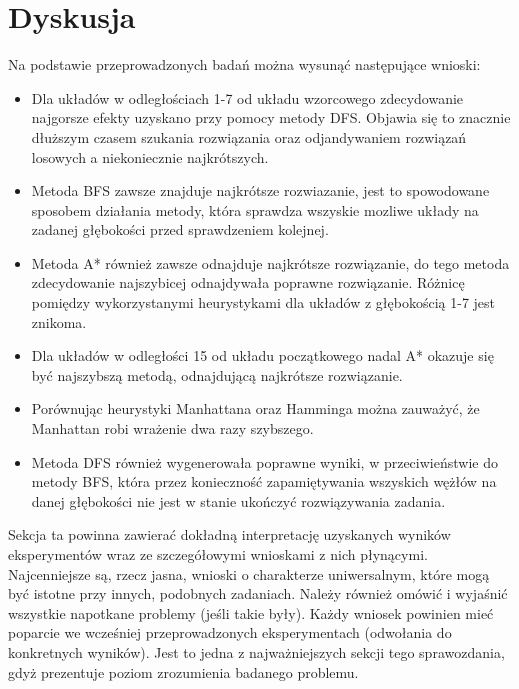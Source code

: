 \documentclass{classrep}
\begin{document}
    \section{Dyskusja}
    {

        Na podstawie przeprowadzonych badań można wysunąć następujące wnioski:
        \begin{itemize}
            \item Dla układów w odległościach 1-7 od układu wzorcowego zdecydowanie najgorsze efekty uzyskano przy pomocy metody DFS.
            Objawia się to znacznie dłuższym czasem szukania rozwiązania oraz odjandywaniem rozwiązań losowych a niekoniecznie najkrótszych.
            \item Metoda BFS zawsze znajduje najkrótsze rozwiazanie, jest to spowodowane sposobem działania metody, która
            sprawdza wszyskie mozliwe układy na zadanej głębokości przed sprawdzeniem kolejnej.
            \item Metoda A* również zawsze odnajduje najkrótsze rozwiązanie, do tego metoda zdecydowanie najszybicej odnajdywała poprawne rozwiązanie.
            Różnicę pomiędzy wykorzystanymi heurystykami dla układów z głębokością 1-7 jest znikoma.
            \item Dla układów w odległości 15 od układu początkowego nadal A* okazuje się być najszybszą metodą, odnajdującą najkrótsze rozwiązanie.
            \item Porównując heurystyki Manhattana oraz Hamminga można zauważyć, że Manhattan robi wrażenie dwa razy szybszego.
            \item Metoda DFS również wygenerowała poprawne wyniki, w przeciwieństwie do metody BFS,
            która przez konieczność zapamiętywania wszyskich wężłów na danej głębokości
            nie jest w stanie ukończyć rozwiązywania zadania.
        \end{itemize}


        Sekcja ta powinna zawierać dokładną interpretację uzyskanych wyników
        eksperymentów wraz ze szczegółowymi wnioskami z nich płynącymi. Najcenniejsze
        są, rzecz jasna, wnioski o charakterze uniwersalnym, które mogą być istotne
    przy innych, podobnych zadaniach. Należy również omówić i wyjaśnić wszystkie
    napotkane problemy (jeśli takie były). Każdy wniosek powinien mieć poparcie we
    wcześniej przeprowadzonych eksperymentach (odwołania do konkretnych wyników).
    Jest to jedna z najważniejszych sekcji tego sprawozdania, gdyż prezentuje
    poziom zrozumienia badanego problemu.}\label{sec:dyskusja}
\end{document}
